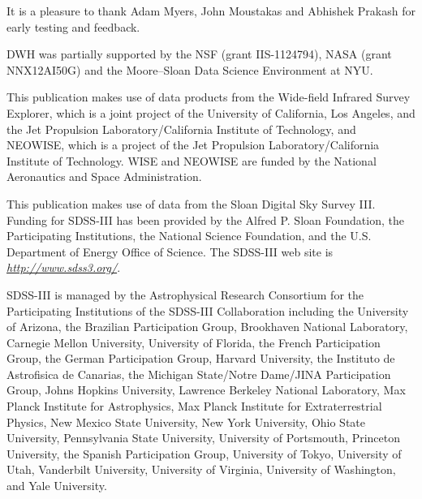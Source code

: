 \documentclass[12pt,preprint]{aastex}
\newcommand{\niceurl}[1]{\href{#1}{\textsl{#1}}}
\begin{document}
%
%
%
% 
% 

\acknowledgements
%
It is a pleasure to thank Adam Myers, John Moustakas and Abhishek
Prakash for early testing and feedback.

DWH was partially supported by the NSF (grant IIS-1124794), NASA
(grant NNX12AI50G) and the Moore--Sloan Data Science Environment at
NYU.

This publication makes use of data products from the Wide-field
Infrared Survey Explorer, which is a joint project of the University
of California, Los Angeles, and the Jet Propulsion
Laboratory/California Institute of Technology, and NEOWISE, which is a
project of the Jet Propulsion Laboratory/California Institute of
Technology. WISE and NEOWISE are funded by the National Aeronautics
and Space Administration.

This publication makes use of data from the Sloan Digital Sky Survey
III.  Funding for SDSS-III has been provided by the Alfred P. Sloan
Foundation, the Participating Institutions, the National Science
Foundation, and the U.S. Department of Energy Office of Science. The
SDSS-III web site is \niceurl{http://www.sdss3.org/}.

SDSS-III is managed by the Astrophysical Research Consortium for the
Participating Institutions of the SDSS-III Collaboration including the
University of Arizona, the Brazilian Participation Group, Brookhaven
National Laboratory, Carnegie Mellon University, University of
Florida, the French Participation Group, the German Participation
Group, Harvard University, the Instituto de Astrofisica de Canarias,
the Michigan State/Notre Dame/JINA Participation Group, Johns Hopkins
University, Lawrence Berkeley National Laboratory, Max Planck
Institute for Astrophysics, Max Planck Institute for Extraterrestrial
Physics, New Mexico State University, New York University, Ohio State
University, Pennsylvania State University, University of Portsmouth,
Princeton University, the Spanish Participation Group, University of
Tokyo, University of Utah, Vanderbilt University, University of
Virginia, University of Washington, and Yale University.
\end{document}
